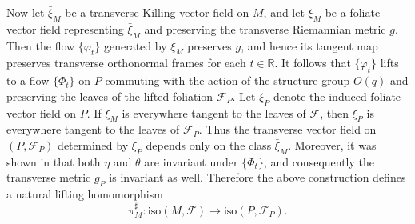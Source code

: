 \documentclass[reqno, 11pt]{amsart}
\theoremstyle{definition}
\theoremstyle{property}
\theoremstyle{remark}
\numberwithin{equation}{section}
\begin{document}
Now let $\bar{\xi}_M$ be a transverse Killing vector field on $M$, and let
$\xi_M$ be a foliate vector field representing $\bar{\xi}_M$ and preserving
the transverse Riemannian metric $g$. Then the flow $\{\varphi_t\}$ generated
by $\xi_M$ preserves $g$, and hence its tangent map preserves transverse
orthonormal frames for each $t\in \mathbb{R}$. It follows that $\{\varphi_t\}$
lifts to a flow $\{\Phi_t\}$ on $P$ commuting with the action of the structure
group $O(q)$ and preserving the leaves of the lifted foliation
$\mathcal{F}_P$. Let $\xi_P$ denote the induced foliate vector field on $P$.
If $\xi_M$ is everywhere tangent to the leaves of $\mathcal{F}$, then
$\xi_P$ is everywhere tangent to the leaves of $\mathcal{F}_P$. Thus the
transverse vector field on $(P,\mathcal{F}_P)$ determined by $\xi_P$ depends
only on the class $\bar{\xi}_M$. Moreover, it was shown in \cite[Sec. 3.3]{Mo88}
that both $\eta$ and $\theta$ are invariant under $\{\Phi_t\}$, and
consequently the transverse metric $g_P$ is invariant as well. Therefore
the above construction defines a natural lifting homomorphism
\begin{equation}\label{lifting-homo}
\pi_M^{\sharp}:\mathrm{iso}(M, \mathcal{F})\rightarrow \mathrm{iso}(P, \mathcal{F}_P).
\end{equation}


\end{document}
